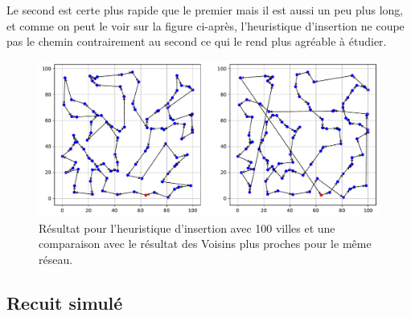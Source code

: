 \documentclass[a4paper,11pt,fleqn]{article}
\begin{document}
Le second est certe plus rapide que le premier mais il est aussi un peu plus long, et comme on peut le voir sur la figure ci-après, l'heuristique d'insertion ne coupe pas le chemin contrairement au second ce qui le rend plus agréable à étudier. 
\begin{figure}[H]
    \centering
    \includegraphics[width=\textwidth]{images/insertion_100_villes_nn.pdf}
    \caption{Résultat pour l'heuristique d'insertion avec 100 villes et une comparaison avec le résultat des Voisins plus proches pour le même réseau.}
    \label{fig:insert-100}
\end{figure}

\subsection*{Recuit simulé}
\end{document}
